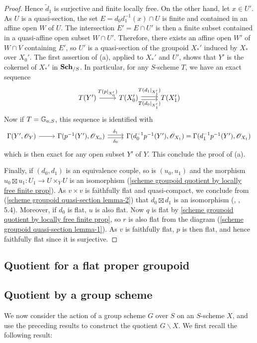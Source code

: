 \begin{proof}
Hence $\tilde{d}_1$ is surjective and finite locally free. On the other hand, let $x\in U'$. As $U$ is a quasi-section, the set $E=d_0d_1^{-1}(x)\cap U$ is finite and contained in an affine open $W$ of $U$. The intersection $E'=E\cap U'$ is then a finite subset contained in a quasi-affine open subset $W\cap U'$. Therefore, there exists an affine open $W'$ of $W\cap V$ containing $E'$, so $U'$ is a quasi-section of the groupoid $X_*'$ induced by $X_*$ over $X_0'$. The first assertion of (a), applied to $X_*'$ and $U'$, shows that $Y'$ is the cokernel of $X_*'$ in $\mathbf{Sch}_{/S}$. In particular, for any $S$-scheme $T$, we have an exact sequence
\[\begin{tikzcd}
T(Y')\ar[r,"T(p|_{X_0'})"]&T(X_0')\ar[r,shift left=2pt,"T(d_1|_{X_1'})"]\ar[r,shift right=2pt,swap,"T(d_0|_{X_1'})"]&T(X_1')
\end{tikzcd}\] 
Now if $T=\mathbb{G}_{a,S}$, this sequence is identified with
\[\begin{tikzcd}
\Gamma(Y',\mathscr{O}_Y)\ar[r]&\Gamma(p^{-1}(Y'),\mathscr{O}_{X_0})\ar[r,shift left=2pt,"\delta_1"]\ar[r,shift right=2pt,swap,"\delta_0"]&\Gamma(d_0^{-1}p^{-1}(Y'),\mathscr{O}_{X_1})=\Gamma(d_1^{-1}p^{-1}(Y'),\mathscr{O}_{X_1})
\end{tikzcd}\]
which is then exact for any open subset $Y'$ of $Y$. This conclude the proof of (a).\par
Finally, if $(d_0,d_1)$ is an equivalence couple, so is $(u_0,u_1)$ and the morphism $u_0\boxtimes u_1:U_1\to U\times_YU$ is an isomorphism (\cref{scheme groupoid quotient by locally free finite prop}). As $v\times v$ is faithfully flat and quasi-compact, we conclude from (\ref{scheme groupoid quasi-section lemma-2}) that $d_0\boxtimes d_1$ is an isomorphism (\cite{SGA1}, , 5.4). Moreover, if $d_0$ is flat, $u$ is also flat. Now $q$ is flat by \cref{scheme groupoid quotient by locally free finite prop}, so $r$ is also flat from the diagram (\ref{scheme groupoid quasi-section lemma-1}). As $v$ is faithfully flat, $p$ is then flat, and hence faithfully flat since it is surjective.
\end{proof}

\subsection{Quotient for a flat proper groupoid}

\subsection{Quotient by a group scheme}
We now consider the action of a group scheme $G$ over $S$ on an $S$-scheme $X$, and use the preceding results to construct the quotient $G\backslash X$. We first recall the following result:

